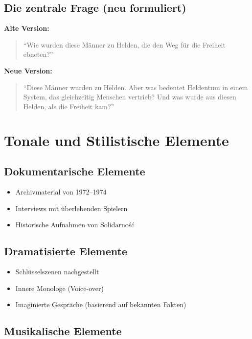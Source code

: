 \documentclass[11pt,a4paper]{book}
\begin{document}
\section{Die zentrale Frage (neu formuliert)}

\textbf{Alte Version:}
\begin{quote}
``Wie wurden diese Männer zu Helden, die den Weg für die Freiheit ebneten?''
\end{quote}

\textbf{Neue Version:}
\begin{quote}
``Diese Männer wurden zu Helden. Aber was bedeutet Heldentum in einem System, das gleichzeitig Menschen vertrieb? Und was wurde aus diesen Helden, als die Freiheit kam?''
\end{quote}


\chapter{Tonale und Stilistische Elemente}

\section{Dokumentarische Elemente}

\begin{itemize}
    \item Archivmaterial von 1972--1974
    \item Interviews mit überlebenden Spielern
    \item Historische Aufnahmen von Solidarność
\end{itemize}

\section{Dramatisierte Elemente}

\begin{itemize}
    \item Schlüsselszenen nachgestellt
    \item Innere Monologe (Voice-over)
    \item Imaginierte Gespräche (basierend auf bekannten Fakten)
\end{itemize}

\section{Musikalische Elemente}
\end{document}

